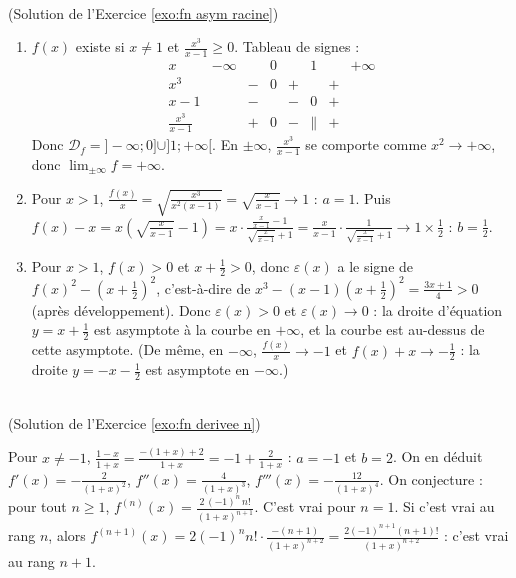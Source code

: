 \begin{corrige}
\begin{sol} ~ \\
(Solution de l'Exercice \ref{exo:fn asym racine})
\begin{enumerate}
\item $f(x)$ existe si $x \neq 1$ et $\frac{x^3}{x-1} \geq 0$. Tableau de signes :
      \[
      \begin{array}{c|ccccccc}
      x & -\infty & & 0 & & 1 & & +\infty \\ \hline
      x^3 & & - & 0 & + & & + & \\ \hline
      x - 1 & & - & & - & 0 & + & \\ \hline
      \frac{x^3}{x-1} & & + & 0 & - & \| & + &
      \end{array}
      \]
      Donc $\mathcal{D}_f = ]-\infty ; 0] \cup ]1 ; +\infty[$. En $\pm\infty$, $\frac{x^3}{x-1}$ se comporte comme $x^2 \to +\infty$, donc $\lim_{\pm\infty} f = +\infty$.
\item Pour $x > 1$, $\frac{f(x)}{x} = \sqrt{\frac{x^3}{x^2(x-1)}} = \sqrt{\frac{x}{x-1}} \to 1$ : $a = 1$.
      Puis $f(x) - x = x\left(\sqrt{\frac{x}{x-1}} - 1\right) = x \cdot \frac{\frac{x}{x-1} - 1}{\sqrt{\frac{x}{x-1}} + 1} = \frac{x}{x-1} \cdot \frac{1}{\sqrt{\frac{x}{x-1}} + 1} \to 1 \times \frac{1}{2}$ :
      $b = \frac{1}{2}$.
\item Pour $x > 1$, $f(x) > 0$ et $x + \frac{1}{2} > 0$, donc $\varepsilon(x)$ a le signe de $f(x)^2 - \left(x + \frac{1}{2}\right)^2$, c'est-\`a-dire de
      $x^3 - (x-1)\left(x + \frac{1}{2}\right)^2 = \frac{3x + 1}{4} > 0$ (apr\`es d\'eveloppement).
      Donc $\varepsilon(x) > 0$ et $\varepsilon(x) \to 0$ : la droite d'\'equation $y = x + \frac{1}{2}$ est asymptote \`a la courbe en $+\infty$,
      et la courbe est au-dessus de cette asymptote.
      (De m\^eme, en $-\infty$, $\frac{f(x)}{x} \to -1$ et $f(x) + x \to -\frac{1}{2}$ : la droite $y = -x - \frac{1}{2}$ est asymptote en $-\infty$.)
\end{enumerate}
\end{sol}

\begin{sol} ~ \\
(Solution de l'Exercice \ref{exo:fn derivee n})

Pour $x \neq -1$, $\frac{1-x}{1+x} = \frac{-(1+x) + 2}{1+x} = -1 + \frac{2}{1+x}$ : $a = -1$ et $b = 2$.
On en d\'eduit $f'(x) = -\frac{2}{(1+x)^2}$, $f''(x) = \frac{4}{(1+x)^3}$, $f'''(x) = -\frac{12}{(1+x)^4}$.
On conjecture : pour tout $n \geq 1$, $\boxed{f^{(n)}(x) = \frac{2\,(-1)^n\, n!}{(1+x)^{n+1}}}$.
C'est vrai pour $n = 1$. Si c'est vrai au rang $n$, alors
$f^{(n+1)}(x) = 2(-1)^n n! \cdot \frac{-(n+1)}{(1+x)^{n+2}} = \frac{2(-1)^{n+1}(n+1)!}{(1+x)^{n+2}}$ : c'est vrai au rang $n+1$.
\end{sol}


\end{corrige}
